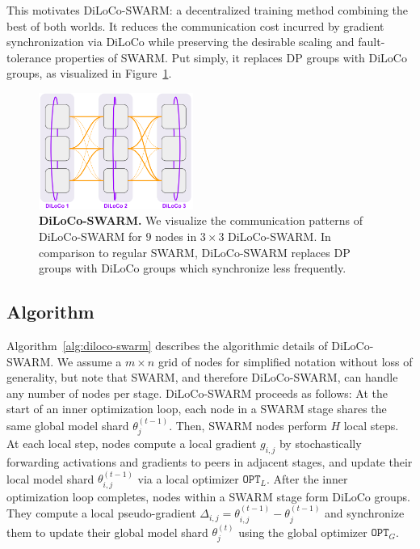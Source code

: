 \documentclass{article}
\begin{document}
This motivates DiLoCo-SWARM: a decentralized training method combining the best
of both worlds. It reduces the communication cost incurred by gradient
synchronization via DiLoCo while preserving the desirable scaling and
fault-tolerance properties of SWARM. Put simply, it replaces DP groups with
DiLoCo groups, as visualized in Figure~\ref{fig:diloco-swarm}.

\begin{figure}[ht]
    \centering
    \includegraphics[width=0.45\textwidth]{figures/diloco-swarm.png}
    \caption{\textbf{DiLoCo-SWARM.} We visualize the communication patterns of
    DiLoCo-SWARM for $9$ nodes in $3\times 3$ DiLoCo-SWARM. In comparison to
    regular SWARM, DiLoCo-SWARM replaces DP groups with DiLoCo groups which
    synchronize less frequently.}
    \label{fig:diloco-swarm}
\end{figure}

\subsection{Algorithm}

Algorithm~\ref{alg:diloco-swarm} describes the algorithmic details of
DiLoCo-SWARM. We assume a $m\times n$ grid of nodes for simplified notation
without loss of generality, but note that SWARM, and therefore DiLoCo-SWARM, can
handle any number of nodes per stage. DiLoCo-SWARM proceeds as follows: At the
start of an inner optimization loop, each node in a SWARM stage shares the same
global model shard $\theta_j^{(t-1)}$. Then, SWARM nodes perform $H$ local
steps. At each local step, nodes compute a local gradient $g_{i,j}$ by
stochastically forwarding activations and gradients to peers in adjacent stages,
and update their local model shard $\theta_{i,j}^{(t-1)}$ via a local optimizer
$\mathtt{OPT}_{L}$. After the inner optimization loop completes, nodes within a
SWARM stage form DiLoCo groups. They compute a local pseudo-gradient
$\Delta_{i,j} = \theta_{i,j}^{(t-1)} - \theta_j^{(t-1)}$ and synchronize them to
update their global model shard $\theta_j^{(t)}$ using the global optimizer
$\mathtt{OPT}_{G}$.
\end{document}
